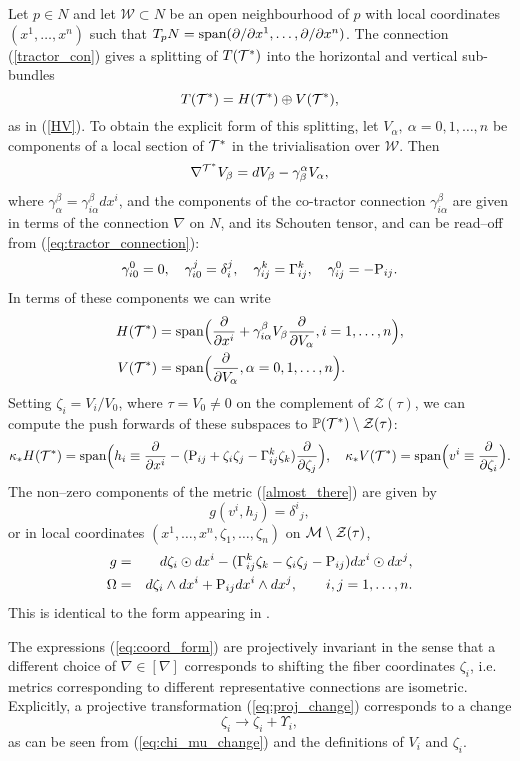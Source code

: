 Let $p\in N$ and let ${\mathcal W}\subset N$ be an open 
neighbourhood of $p$ with 
local coordinates $(x^1, \dots, x^n)$ such that
$T_pN=\mbox{span}(\partial/\partial x^1, \dots, \partial/\partial x^n)$. The connection 
(\ref{tractor_con}) gives a splitting of $T(\mathcal{T}^*)$ into the horizontal and
vertical sub-bundles
\[
T(\mathcal{T}^*)=H(\mathcal{T}^*)\oplus V(\mathcal{T}^*),
\]
as in (\ref{HV}).
To obtain the explicit form of this splitting, let $V_\alpha,\ \alpha=0, 1, \dots, n$ be components of a local section of $\mathcal{T}^*$ in the trivialisation over ${\mathcal{W}}$.
Then
\[
\nabla^{\mathcal{T}^*} V_\beta=d V_\beta-\gamma_{\beta}^{\alpha} V_\alpha,
\]
where $\gamma_{\alpha}^\beta= \gamma_{i\alpha}^\beta dx^i$, and the components
of the co-tractor connection 
$\gamma_{i\alpha}^\beta$  are given in terms of the connection
$\nabla$ on $N$, and its Schouten tensor, and 
can be read--off from (\ref{eq:tractor_connection}):
\[
\gamma_{i0}^0=0, \quad \gamma_{i0}^j=\delta_i^j,\quad
\gamma_{ij}^k=\Gamma_{ij}^k, \quad \gamma_{ij}^0=-\mathrm{P}_{ij}.
\]
In terms of these components we can write
\begin{align*}
H(\mathcal{T}^*)&=\mbox{span}
\Big( \frac{\partial}{\partial x^i}+ {\gamma_{i\alpha}^\beta} V_\beta
\frac{\partial}{\partial V_{\alpha}}, i=1, \dots, n \Big), \\
 V(\mathcal{T}^*)&=\mbox{span}\Big(\frac{\partial}{\partial V_{\alpha}}, \alpha=0, 1, 
\dots, n\Big).
\end{align*}
Setting $\zeta_i=V_i/V_0$, where $\tau=V_0\neq 0$ %
on the complement of 
$\mathcal{Z}(\tau)$, 
  we can compute the push forwards
of these subspaces to $\mathbb{P}(\mathcal{T}^*)\setminus {\mathcal{Z}(\tau)}$:
\[
\kappa_* H(\mathcal{T}^*)=\mbox{span}\Big(h_i\equiv
\frac{\partial}{\partial x^i}-
(\mathrm{P}_{ij}+\zeta_i\zeta_j  -\Gamma_{ij}^k\zeta_k)\frac{\partial}{\partial \zeta_j}
\Big), \quad \kappa_* V(\mathcal{T}^*)=\mbox{span}\Big(v^i\equiv\frac{\partial}{\partial \zeta_i}
\Big).
\]
The non--zero components of the  metric (\ref{almost_there}) are given by
\[
g(v^i, h_j)={\delta^i}_j,
\]
or in local coordinates $(x^1,\dots,x^n,\zeta_1,\dots,\zeta_n)$ on $\mathcal{M}\setminus {\mathcal{Z}(\tau)}$,
\begin{eqnarray}
g & = &  d\zeta_{i}\odot dx^{i}-(\Gamma_{ij}^{k}\zeta_{k}-\zeta_{i}\zeta_{j}-\mathrm{P}_{ij}) dx^{i}\odot dx^{j},\label{eq:coord_form}\\
\Omega & = &  d\zeta_{i}\wedge dx^{i}+\mathrm{P}_{ij} dx^{i}\wedge dx^{j},\qquad i,j=1,\dots ,n.\nonumber 
\end{eqnarray}
This is identical to the form appearing in \cite{DM}.
\koniec

\begin{rmk}
The expressions (\ref{eq:coord_form}) are projectively invariant in the sense that a different choice of $\nabla\in[\nabla]$ corresponds to shifting the fiber coordinates $\zeta_{i}$, i.e. metrics corresponding to different representative connections are isometric. Explicitly, a projective transformation (\ref{eq:proj_change}) corresponds to a change \begin{equation}
\zeta_{i}\longrightarrow \zeta_{i}+\Upsilon_{i},\label{eq:p_change}
\end{equation}
as can be seen from (\ref{eq:chi_mu_change}) and the definitions of $V_i$ and $\zeta_i$.
\end{rmk}

